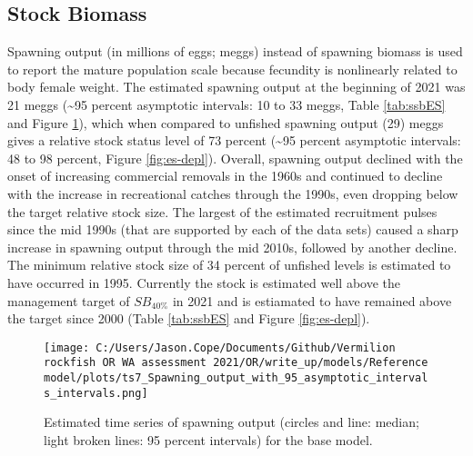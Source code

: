 \documentclass[11pt,
  english,
  a4paper,
]{article}
\begin{document}
\leavevmode\tagmcend\tagstructend\par


\hypertarget{stock-biomass}{%
\subsection*{Stock Biomass}\label{stock-biomass}}

\leavevmode\tagmcend\tagstructend


Spawning output (in millions of eggs; meggs) instead of spawning biomass is used to report the mature population scale because fecundity is nonlinearly related to body female weight. The estimated spawning output at the beginning of 2021 was 21 meggs (\textasciitilde95 percent asymptotic intervals: 10 to 33 meggs, Table \ref{tab:ssbES} and Figure \ref{fig:es-ssb}), which when compared to unfished spawning output (29) meggs gives a relative stock status level of 73 percent (\textasciitilde95 percent asymptotic intervals: 48 to 98 percent, Figure \ref{fig:es-depl}). Overall, spawning output declined with the onset of increasing commercial removals in the 1960s and continued to decline with the increase in recreational catches through the 1990s, even dropping below the target relative stock size. The largest of the estimated recruitment pulses since the mid 1990s (that are supported by each of the data sets) caused a sharp increase in spawning output through the mid 2010s, followed by another decline. The minimum relative stock size of 34 percent of unfished levels is estimated to have occurred in 1995. Currently the stock is estimated well above the management target of {\(SB_{40\%}\)\leavevmode\tagmcend\tagstructend} in 2021 and is estiamated to have remained above the target since 2000 (Table \ref{tab:ssbES} and Figure \ref{fig:es-depl}).

\leavevmode\tagmcend\tagstructend\par




\begin{figure}
\centering
\texttt{[image: C:/Users/Jason.Cope/Documents/Github/Vermilion rockfish OR WA assessment 2021/OR/write\_up/models/Reference model/plots/ts7\_Spawning\_output\_with\_95\_asymptotic\_intervals\_intervals.png]}
\caption{Estimated time series of spawning output (circles and line: median; light broken lines: 95 percent intervals) for the base model.\label{fig:es-ssb}}
\end{figure}
\end{document}
